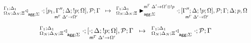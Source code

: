 
\[
\trans{
   \contstatea{\Delta_N}{\cdot ; \pframe{p_1, \Gamma''}{\Delta}{\bang
   p}{\Omega}{\Delta'}{\Omega'}, \lstack{P}}{\Gamma}{\Sigma}
}
{
   \matstatea{\Delta_N}{\cdot; \pframe{\Gamma''}{\Delta}{\bang p}
      {\Omega}{\Delta'}{\Omega'}, \lstack{P}}{\Gamma}{\Delta}{p,
      \Omega}{\Delta' \rightarrow \Omega' \otimes \bang p}{\Sigma}
}
\]

\[
\trans{
   \contstatea{\Delta_N}{\cdot; \pframe{\cdot}{\Delta}{\bang
   p}{\Omega}{\Delta'}{\Omega'}, \lstack{P}}{\Gamma}{\Sigma}
}
{
   \contstatea{\Delta_N}{\cdot ; \lstack{P}}{\Gamma}{\Sigma}
}
\]
